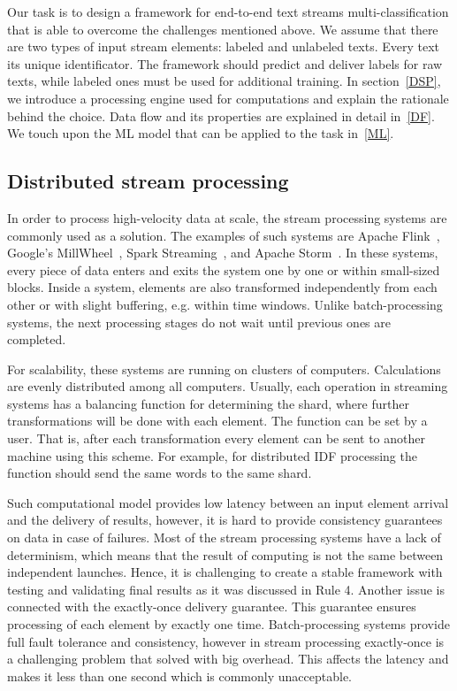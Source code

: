 

Our task is to design a framework for end-to-end text streams multi-classification that is able to overcome the challenges mentioned above. We assume that there are two types of input stream elements: labeled and unlabeled texts. Every text its unique identificator. The framework should predict and deliver labels for raw texts, while labeled ones must be used for additional training. In section~\ref{DSP}, we introduce a processing engine used for computations and explain the rationale behind the choice. Data flow and its properties are explained in detail in~\ref{DF}. We touch upon the ML model that can be applied to the task in~\ref{ML}.

\subsection{Distributed stream processing\label{DSP}}

In order to process high-velocity data at scale, the stream processing systems are commonly used as a solution. The examples of such systems are Apache Flink~\cite{Carbone:2017:SMA:3137765.3137777}, Google's MillWheel~\cite{Akidau:2013:MFS:2536222.2536229}, Spark Streaming~\cite{Zaharia:2012:DSE:2342763.2342773}, and Apache Storm~\cite{apache:storm}. In these systems, every piece of data enters and exits the system one by one or within small-sized blocks. Inside a system, elements are also transformed independently from each other or with slight buffering, e.g. within time windows. Unlike batch-processing systems, the next processing stages do not wait until previous ones are completed. 

For scalability, these systems are running on clusters of computers. Calculations are evenly distributed among all computers. Usually, each operation in streaming systems has a balancing function for determining the shard, where further transformations will be done with each element. The function can be set by a user. That is, after each transformation every element can be sent to another machine using this scheme. For example, for distributed IDF processing the function should send the same words to the same shard.

Such computational model provides low latency between an input element arrival and the delivery of results, however, it is hard to provide consistency guarantees on data in case of failures. Most of the stream processing systems have a lack of determinism, which means that the result of computing is not the same between independent launches. Hence, it is challenging to create a stable framework with testing and validating final results as it was discussed in \cite{stonebraker20058} Rule 4. Another issue is connected with the exactly-once delivery guarantee. This guarantee ensures processing of each element by exactly one time. Batch-processing systems provide full fault tolerance and consistency, however in stream processing exactly-once is a challenging problem that solved with big overhead. This affects the latency and makes it less than one second which is commonly unacceptable.

